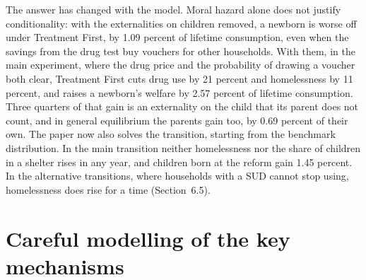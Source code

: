 \documentclass[11pt]{article}
\begin{document}
{The answer has changed with the model. Moral hazard alone does not justify
conditionality: with the externalities on children removed, a newborn is worse
off under Treatment First, by 1.09 percent of lifetime consumption, even when the
savings from the drug test buy vouchers for other households. With them, in the
main experiment, where the drug price and the probability of drawing a voucher
both clear, Treatment First cuts drug use by 21 percent and homelessness by 11
percent, and raises a newborn's welfare by 2.57 percent of lifetime consumption.
Three quarters of that gain is an externality on the child that its parent does
not count, and in general equilibrium the parents gain too, by 0.69 percent of
their own. The paper now also solves the transition, starting from the benchmark
distribution. In the main transition neither homelessness nor the share of
children in a shelter rises in any year, and children born at the reform gain
1.45 percent. In the alternative transitions, where households with a SUD cannot
stop using, homelessness does rise for a time (Section~6.5).
}

\section*{Careful modelling of the key mechanisms}
\end{document}
